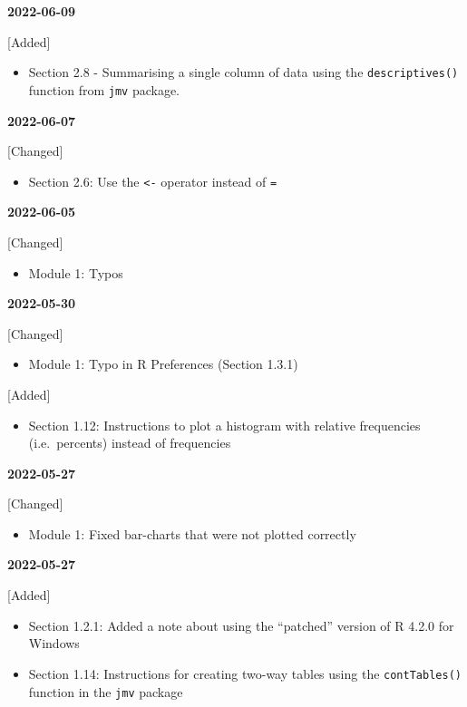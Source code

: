 \documentclass[
]{memoir}
\providecommand{\tightlist}{%
  \setlength{\itemsep}{0pt}\setlength{\parskip}{0pt}}
\begin{document}
\textbf{2022-06-09}

{[}Added{]}

\begin{itemize}
\tightlist
\item
  Section 2.8 - Summarising a single column of data using the \texttt{descriptives()} function from \texttt{jmv} package.
\end{itemize}

\textbf{2022-06-07}

{[}Changed{]}

\begin{itemize}
\tightlist
\item
  Section 2.6: Use the \texttt{\textless{}-} operator instead of \texttt{=}
\end{itemize}

\textbf{2022-06-05}

{[}Changed{]}

\begin{itemize}
\tightlist
\item
  Module 1: Typos
\end{itemize}

\textbf{2022-05-30}

{[}Changed{]}

\begin{itemize}
\tightlist
\item
  Module 1: Typo in R Preferences (Section 1.3.1)
\end{itemize}

{[}Added{]}

\begin{itemize}
\tightlist
\item
  Section 1.12: Instructions to plot a histogram with relative frequencies (i.e.~percents) instead of frequencies
\end{itemize}

\textbf{2022-05-27}

{[}Changed{]}

\begin{itemize}
\tightlist
\item
  Module 1: Fixed bar-charts that were not plotted correctly
\end{itemize}

\textbf{2022-05-27}

{[}Added{]}

\begin{itemize}
\tightlist
\item
  Section 1.2.1: Added a note about using the ``patched'' version of R 4.2.0 for Windows
\item
  Section 1.14: Instructions for creating two-way tables using the \texttt{contTables()} function in the \texttt{jmv} package
\end{itemize}
\end{document}

